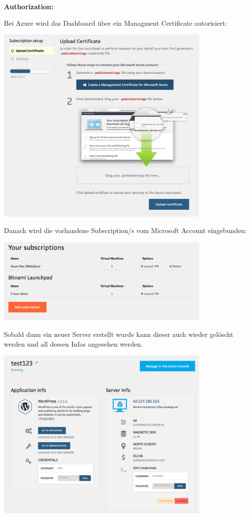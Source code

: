 \documentclass[11pt]{scrartcl}
\begin{document}
\textbf{Authorization:}

Bei Azure wird das Dashboard über ein Managment Certificate autorisiert:

\includegraphics[width=0.8\textwidth]{azure_authorize}

Danach wird die vorhandene Subscription/s vom Microsoft Account eingebunden:

\includegraphics[width=0.8\textwidth]{azure_subscriptions}


Sobald dann ein neuer Server erstellt wurde kann dieser auch wieder gelöscht 
werden und all dessen Infos angesehen werden.

\includegraphics[width=0.8\textwidth]{azure_instanceinfos}
\end{document}
